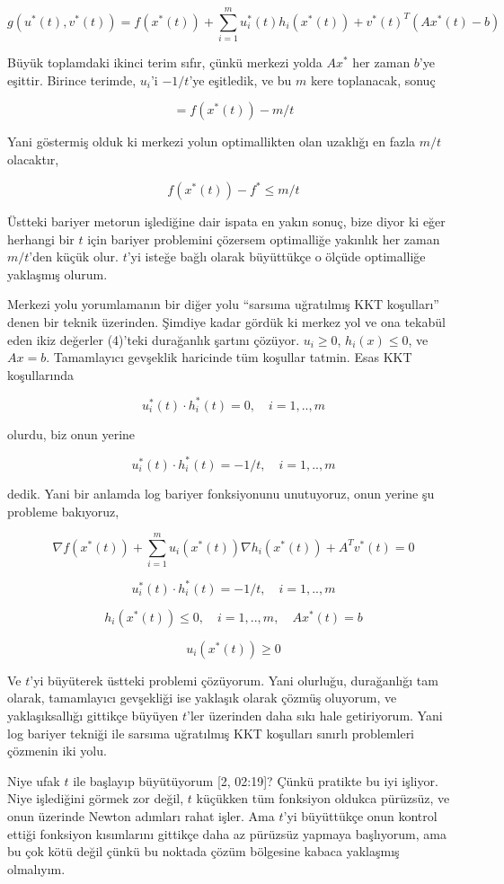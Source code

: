 \documentclass[12pt,fleqn]{article}\usepackage{../../common}
\begin{document}
$$
g(u^\ast(t),v^\ast(t)) = 
f(x^\ast(t)) + \sum_{i=1}^{m} u_i^\ast(t) h_i(x^\ast(t)) + v^\ast(t)^T (Ax^\ast(t) - b)
$$

Büyük toplamdaki ikinci terim sıfır, çünkü merkezi yolda $Ax^\ast$ her zaman
$b$'ye eşittir. Birince terimde, $u_i$'i $-1/t$'ye eşitledik, ve bu $m$
kere toplanacak, sonuç

$$
= f(x^\ast(t)) - m/t
$$

Yani göstermiş olduk ki merkezi yolun optimallikten olan uzaklığı en fazla
$m/t$ olacaktır,

$$
f(x^\ast(t)) - f^\ast \le m/t
$$

Üstteki bariyer metorun işlediğine dair ispata en yakın sonuç, bize diyor
ki eğer herhangi bir $t$ için bariyer problemini çözersem optimalliğe
yakınlık her zaman $m/t$'den küçük olur. $t$'yi isteğe bağlı olarak
büyüttükçe o ölçüde optimalliğe yaklaşmış olurum. 

Merkezi yolu yorumlamanın bir diğer yolu ``sarsıma uğratılmış KKT
koşulları'' denen bir teknik üzerinden. Şimdiye kadar gördük ki merkez yol
ve ona tekabül eden ikiz değerler (4)'teki durağanlık şartını çözüyor. 
$u_i \ge 0$, $h_i(x) \le 0$, ve $Ax = b$. Tamamlayıcı gevşeklik haricinde tüm
koşullar tatmin. Esas KKT koşullarında 

$$
u_i^\ast(t) \cdot h_i^\ast(t) = 0, \quad i=1,..,m
$$

olurdu, biz onun yerine 

$$
u_i^\ast(t) \cdot h_i^\ast(t) = -1/t, \quad i=1,..,m
$$

dedik. Yani bir anlamda log bariyer fonksiyonunu unutuyoruz, onun yerine şu
probleme bakıyoruz,

$$
\nabla f(x^\ast(t)) + \sum_{i=1}^{m} u_i(x^\ast(t))\nabla h_i(x^\ast(t)) + A^T v^\ast(t) = 0
$$

$$
u_i^\ast(t) \cdot h_i^\ast(t) = -1/t, \quad i=1,..,m
$$

$$
h_i(x^\ast(t)) \le 0, \quad i=1,..,m, \quad Ax^\ast(t) = b
$$

$$
u_i(x^\ast(t)) \ge 0
$$

Ve $t$'yi büyüterek üstteki problemi çözüyorum. Yani olurluğu, durağanlığı
tam olarak, tamamlayıcı gevşekliği ise yaklaşık olarak çözmüş oluyorum, ve
yaklaşıksallığı gittikçe büyüyen $t$'ler üzerinden daha sıkı hale getiriyorum. 
Yani log bariyer tekniği ile sarsıma uğratılmış KKT koşulları sınırlı
problemleri çözmenin iki yolu. 

Niye ufak $t$ ile başlayıp büyütüyorum [2, 02:19]? Çünkü pratikte bu iyi
işliyor. Niye işlediğini görmek zor değil, $t$ küçükken tüm fonksiyon
oldukca pürüzsüz, ve onun üzerinde Newton adımları rahat işler. Ama $t$'yi
büyüttükçe onun kontrol ettiği fonksiyon kısımlarını gittikçe daha az
pürüzsüz yapmaya başlıyorum, ama bu çok kötü değil çünkü bu noktada çözüm
bölgesine kabaca yaklaşmış olmalıyım. 
\end{document}
